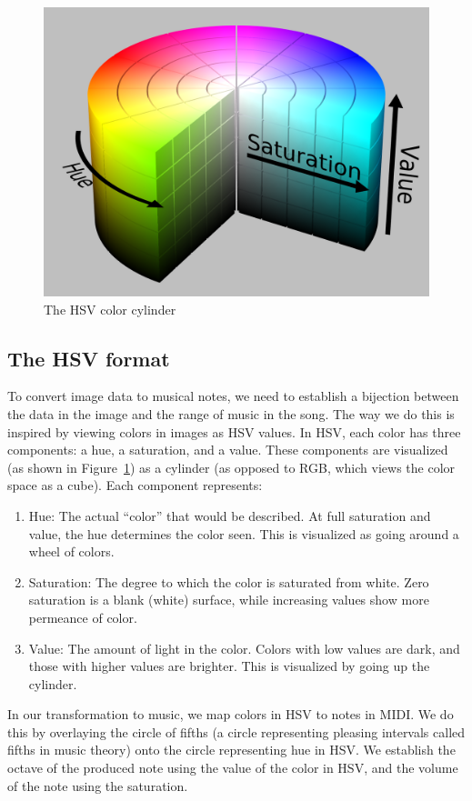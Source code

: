 \documentclass[10pt, conference, compsocconf]{IEEEtran}
\begin{document}
\begin{figure}[h]
  \centering
  \includegraphics[width=.4\textwidth]{hsv.png}
  \caption{The HSV color cylinder}
  \label{fig:hsv}
\end{figure}

\subsection{The HSV format}

To convert image data to musical notes, we need to establish a
bijection between the data in the image and the range of music in the
song.  The way we do this is inspired by viewing colors in images as
HSV values.  In HSV, each color has three components: a hue, a
saturation, and a value.  These components are visualized (as shown in
Figure~\ref{fig:hsv}) as a cylinder (as opposed to RGB, which views
the color space as a cube).  Each component represents:

\begin{enumerate}
\item Hue: The actual ``color'' that would be described.  At full
  saturation and value, the hue determines the color seen.  This is
  visualized as going around a wheel of colors.

\item Saturation: The degree to which the color is saturated from
  white.  Zero saturation is a blank (white) surface, while increasing
  values show more permeance of color.

\item Value: The amount of light in the color.  Colors with low values
  are dark, and those with higher values are brighter.  This is
  visualized by going up the cylinder.
\end{enumerate}

In our transformation to music, we map colors in HSV to notes in MIDI.
We do this by overlaying the circle of fifths (a circle representing
pleasing intervals called fifths in music theory) onto the circle
representing hue in HSV.  We establish the octave of the produced note
using the value of the color in HSV, and the volume of the note using
the saturation.
\end{document}
